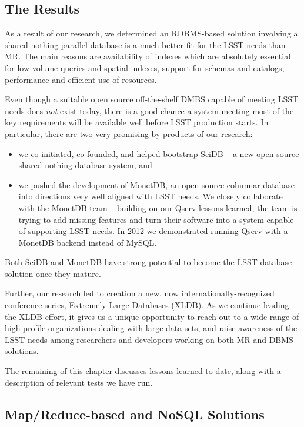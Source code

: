 \documentclass[DM,lsstdraft,toc]{lsstdoc}
\begin{document}
\subsection{The Results}\label{the-results}

As a result of our research, we determined an RDBMS-based solution
involving a shared-nothing parallel database is a much better fit for
the LSST needs than MR. The main reasons are availability of indexes
which are absolutely essential for low-volume queries and spatial
indexes, support for schemas and catalogs, performance and efficient use
of resources.

Even though a suitable open source off-the-shelf DMBS capable of meeting
LSST needs does \emph{not} exist today, there is a good chance a system
meeting most of the key requirements will be available well before LSST
production starts. In particular, there are two very promising
by-products of our research:

\begin{itemize}
\item
  we co-initiated, co-founded, and helped bootstrap SciDB -- a new open
  source shared nothing database system, and
\item
  we pushed the development of MonetDB, an open source columnar database
  into directions very well aligned with LSST needs. We closely
  collaborate with the MonetDB team -- building on our Qserv
  lessons-learned, the team is trying to add missing features and turn
  their software into a system capable of supporting LSST needs. In 2012
  we demonstrated running Qserv with a MonetDB backend instead of MySQL.
\end{itemize}

Both SciDB and MonetDB have strong potential to become the LSST database
solution once they mature.

Further, our research led to creation a new, now
internationally-recognized conference series,
\href{http://xldb.org}{Extremely Large Databases (XLDB)}. As we continue
leading the \href{http://xldb.org}{XLDB} effort, it gives us a unique
opportunity to reach out to a wide range of high-profile organizations
dealing with large data sets, and raise awareness of the LSST needs
among researchers and developers working on both MR and DBMS solutions.

The remaining of this chapter discusses lessons learned to-date, along
with a description of relevant tests we have run.

\subsection{Map/Reduce-based and NoSQL
Solutions}\label{mapreduce-based-and-nosql-solutions}
\end{document}
